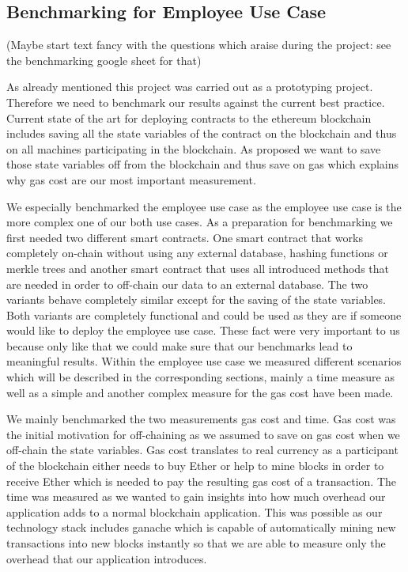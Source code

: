 \subsection{Benchmarking for Employee Use Case}
(Maybe start text fancy with the questions which araise during the project: see the benchmarking google sheet for that)

As already mentioned this project was carried out as a prototyping project. Therefore we need to benchmark our results against the current best practice. Current state of the art for deploying contracts to the ethereum blockchain includes saving all the state variables of the contract on the blockchain and thus on all machines participating in the blockchain. As proposed we want to save those state variables off from the blockchain and thus save on gas which explains why gas cost are our most important measurement.

We especially benchmarked the employee use case as the employee use case is the more complex one of our both use cases. As a preparation for benchmarking we first needed two different smart contracts. One smart contract that works completely on-chain without using any external database, hashing functions or merkle trees and another smart contract that uses all introduced methods that are needed in order to off-chain our data to an external database. The two variants behave completely similar except for the saving of the state variables. Both variants are completely functional and could be used as they are if someone would like to deploy the employee use case. These fact were very important to us because only like that we could make sure that our benchmarks lead to meaningful results. Within the employee use case we measured different scenarios which will be described in the corresponding sections, mainly a time measure as well as a simple and another complex measure for the gas cost have been made.

We mainly benchmarked the two measurements gas cost and time. Gas cost was the initial motivation for off-chaining as we assumed to save on gas cost when we off-chain the state variables. Gas cost translates to real currency as a participant of the blockchain either needs to buy Ether or help to mine blocks in order to receive Ether which is needed to pay the resulting gas cost of a transaction. The time was measured as we wanted to gain insights into how much overhead our application adds to a normal blockchain application. This was possible as our technology stack includes ganache which is capable of automatically mining new transactions into new blocks instantly so that we are able to measure only the overhead that our application introduces.

